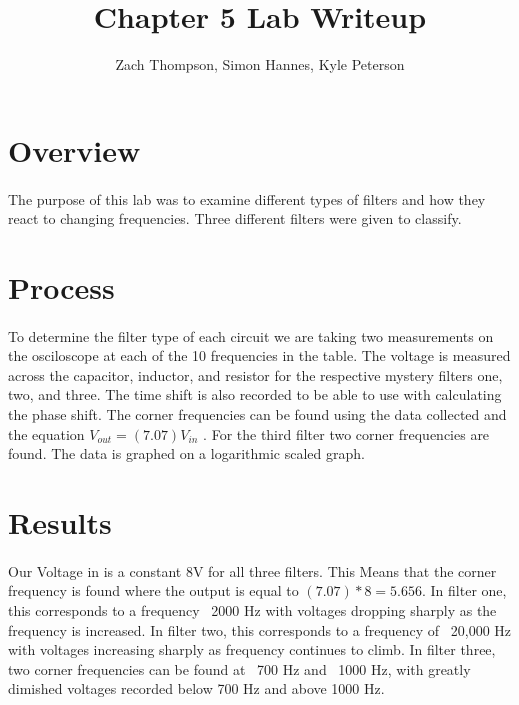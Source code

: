 \documentclass{article}
\title{Chapter 5 Lab Writeup}
\author{Zach Thompson, Simon Hannes, Kyle Peterson}
\begin{document}
\maketitle{}

\section*{Overview}
\paragraph{}
The purpose of this lab was to examine different types of filters and how they react to changing frequencies.
Three different filters were given to classify.



\section*{Process}
\paragraph{}
To determine the filter type of each circuit we are taking two measurements on the osciloscope at each of the 
10 frequencies in the table. The voltage is measured across the capacitor, inductor, and resistor for the 
respective mystery filters one, two, and three. The time shift is also recorded to be able to use with 
calculating the phase shift. The corner frequencies can be found using the data collected and the equation 
$ V_{out} = (7.07)   V_{in}$ . For the third filter two corner frequencies are found. The data is graphed on 
a logarithmic scaled graph.

\section*{Results}
\paragraph{}
Our Voltage in is a constant 8V for all three filters. This Means that the corner frequency is found where the output
 is equal to $(7.07) * 8 = 5.656$. In filter one, this corresponds to a frequency ~2000 Hz with voltages dropping 
 sharply as the frequency is increased. In filter two, this corresponds to a frequency of ~20,000 Hz with voltages increasing
 sharply as frequency continues to climb. In filter three, two corner frequencies can be found at ~700 Hz and ~1000 Hz, 
 with greatly dimished voltages recorded below 700 Hz and above 1000 Hz. 
\end{document}
